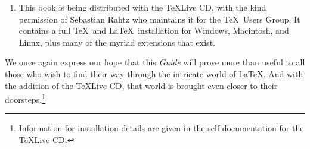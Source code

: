 \documentclass{article}
\begin{document}
\begin{enumerate}
  On the other hand, the other Web output formats, HTML and XML, are only
  dealt with briefly in Appendix E, since these are large topics
  treated in other books, most noticeably the \textsl{\LaTeX\ Web Companion}.

\item This book is being distributed with the \TeX Live CD, with the kind
  permission of Sebastian Rahtz who maintains it for the \TeX\ Users Group.
  It contains a full \TeX\ and \LaTeX\ installation for Windows, Macintosh,
  and Linux, plus many of the myriad extensions that exist.
\end{enumerate}

We once again express our hope that this \textsl{Guide} will prove more than
useful to all those who wish to find their way through the intricate world of
\LaTeX. And with the addition of the \TeX Live CD, that world is brought even
closer to their doorsteps.\footnote{Information for installation details are
given in the self documentation for the \TeX Live CD.}
\end{document}
